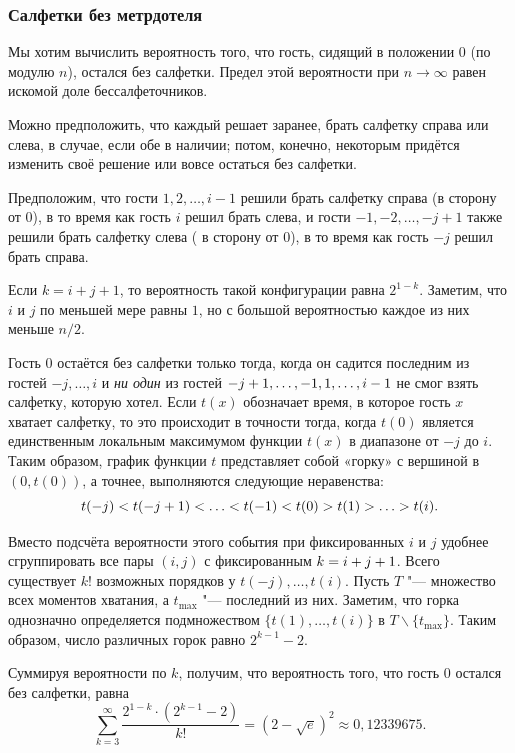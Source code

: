 \documentclass[twoside]{book}
\begin{document}
\subsubsection*{Салфетки без метрдотеля}

Мы хотим вычислить вероятность того, что гость, сидящий в положении 0 (по модулю $n$), остался без салфетки.
Предел этой вероятности при $n\to\infty$ равен искомой доле бессалфеточников.

Можно предположить, что каждый решает заранее, брать салфетку справа или слева, в случае, если обе в наличии;
потом, конечно, некоторым придётся изменить своё решение или вовсе остаться без салфетки.

Предположим, что гости $1,2,\dots, i - 1$ решили брать салфетку справа  (в сторону от 0), в то время как гость $i$ решил брать слева,
и гости $-1,-2,\dots, -j + 1$ также решили брать салфетку слева ( в сторону от 0), в то время как гость $-j$ решил брать справа.

Если $k = i+j+1$, то вероятность такой конфигурации равна $2^{1-k}$.
Заметим, что $i$ и $j$ по меньшей мере равны $1$, но с большой вероятностью каждое из них меньше $n/2$.

Гость $0$ остаётся без салфетки только тогда, когда он садится последним из гостей $-j,\dots,i$ и \emph{ни один} из гостей $-j\z+1,\z\dots,-1,1,\dots,i-1$ не смог взять салфетку, которую хотел.
Если $t(x)$ обозначает время, в которое гость $x$ хватает салфетку, то это происходит в точности тогда, когда $t(0)$ является единственным локальным максимумом функции $t(x)$ в диапазоне от $-j$ до $i$.
Таким образом, график функции $t$ представляет собой «горку» с вершиной в $(0,t(0))$, 
а точнее, выполняются следующие неравенства: 
\[t(-j)\z<t(-j+1) \z<\z\dots\z<t(-1)\z<t(0)\z>t(1)\z>\z\dots\z>t(i).\]

Вместо подсчёта вероятности этого события при фиксированных $i$ и $j$ удобнее сгруппировать все пары $(i, j)$ с фиксированным $k=i\z+j+1$.
Всего существует $k!$ возможных порядков у $t(-j),\dots, t (i)$.
Пусть $T$ "--- множество всех моментов хватания, а $t_{{\max}}$ "--- последний из них. 
Заметим, что горка однозначно определяется подмножеством $\{t(1),\dots,t(i)\}$ в $T\backslash \{t_{{\max}}\}$.
Таким образом, число различных горок равно $2^{k-1}-2$.

Суммируя вероятности по $k$, получим, что вероятность того, что гость 0 остался без салфетки, равна
\[\sum_{k=3}^\infty\frac{2^{1-k}\cdot(2^{k-1}-2)}{k!}=(2-\sqrt{e})^2\approx 0{,}12339675.\]
\heartf
\end{document}
